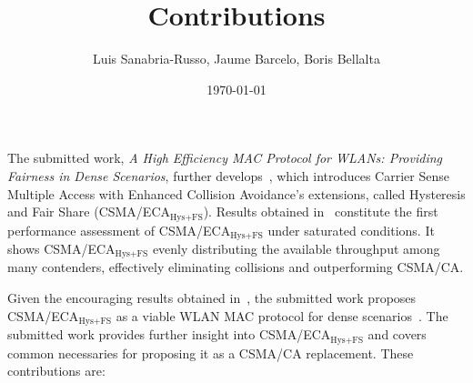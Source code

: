 \documentclass[]{article}
\begin{document}
\title{Contributions}
\author{Luis Sanabria-Russo, Jaume Barcelo, Boris Bellalta}
\date{\today}
\maketitle

The submitted work, \emph{A High Efficiency MAC Protocol for WLANs: Providing Fairness in Dense Scenarios}, further develops~\cite{research2standards}, which introduces Carrier Sense Multiple Access with Enhanced Collision Avoidance's extensions, called Hysteresis and Fair Share (CSMA/ECA$_{\text{Hys+FS}}$). Results obtained in~\cite{research2standards} constitute the first performance assessment of CSMA/ECA$_{\text{Hys+FS}}$ under saturated conditions. It shows CSMA/ECA$_{\text{Hys+FS}}$ evenly distributing the available throughput among many contenders, effectively eliminating collisions and outperforming CSMA/CA. 

Given the encouraging results obtained in~\cite{research2standards}, the submitted work proposes CSMA/ECA$_{\text{Hys+FS}}$ as a viable WLAN MAC protocol for dense scenarios~\cite{HEW-scenarios}. The submitted work provides further insight into CSMA/ECA$_{\text{Hys+FS}}$ and covers common necessaries for proposing it as a CSMA/CA replacement. These contributions are:
\end{document}
